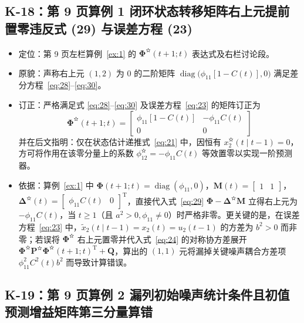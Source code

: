 \subsection{K-18：第 9 页算例 1 闭环状态转移矩阵右上元提前置零违反式 (29) 与误差方程 (23)}\label{sec:k18}

\begin{itemize}
\item 定位：第 9 页左栏算例~\ref{ex:1} 的 $\bm{\Phi}^{\text{✫}}(t + 1; t)$ 表达式及右栏讨论段。
\item 原貌：声称右上元 $(1, 2)$ 为 $0$ 的二阶矩阵 $\operatorname{diag}\bigl(\phi_{11}[1 - C(t)], 0\bigr)$ 满足差分方程~\eqref{eq:28}–\eqref{eq:30}。
\item 订正：严格满足式 \eqref{eq:28}–\eqref{eq:30} 及误差方程~\eqref{eq:23} 的矩阵订正为
\begin{equation*}
\bm{\Phi}^{\text{✫}}(t + 1; t) = \begin{bmatrix} \phi_{11}[1 - C(t)] & -\phi_{11}C(t) \\ 0 & 0 \end{bmatrix}
\end{equation*}
并在后文指明：仅在状态估计递推式~\eqref{eq:21} 中，因恒有 $x_2^{\text{✫}}(t \mid t - 1) = 0$，方可将作用在该零分量上的系数 $\phi_{12}^{\text{✫}} = -\phi_{11}C(t)$ 等效置零以实现一阶预测器。
\item 依据：算例~\ref{ex:1} 中 $\bm{\Phi}(t + 1; t) = \operatorname{diag}(\phi_{11}, 0)$，$\bm{M}(t) = \begin{bmatrix} 1 & 1 \end{bmatrix}$，$\bm{\Delta}^{\text{✫}}(t) = \begin{bmatrix} \phi_{11}C(t) & 0 \end{bmatrix}^{\mathrm{T}}$，直接代入式~\eqref{eq:29} $\bm{\Phi} - \bm{\Delta}^{\text{✫}}\bm{M}$ 立得右上元为 $-\phi_{11}C(t)$，当 $t \geq 1$（且 $a^2 > 0, \phi_{11} \neq 0$）时严格非零。更关键的是，在误差方程~\eqref{eq:23} 中，$\tilde{x}_2(t \mid t - 1) = x_2(t) = u_2(t - 1)$ 的方差为 $b^2 > 0$ 而非零；若误将 $\bm{\Phi}^{\text{✫}}$ 右上元置零并代入式~\eqref{eq:24} 的对称协方差展开 $\bm{\Phi}^{\text{✫}}\bm{P}^{\text{✫}}\bm{\Phi}^{\text{✫}}(t + 1; t)^{\mathrm{T}} + \bm{Q}$，算出的 $(1, 1)$ 元将漏掉关键噪声耦合方差项 $\phi_{11}^2 C^2(t)b^2$ 而导致计算错误。
\end{itemize}

\subsection{K-19：第 9 页算例 2 漏列初始噪声统计条件且初值预测增益矩阵第三分量算错}\label{sec:k19}

